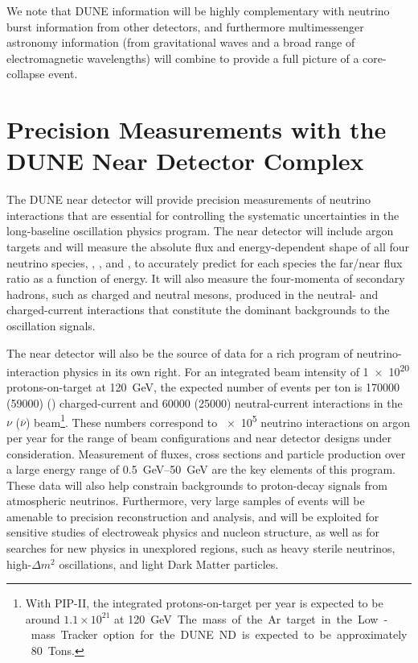 We note that DUNE information will be highly complementary with neutrino burst information from other detectors, and furthermore multimessenger astronomy information (from gravitational waves and a broad range of electromagnetic wavelengths) will combine to provide a full picture of a core-collapse event.



\section{Precision Measurements with the DUNE Near Detector Complex}
\label{sec:exec-summ-nd-precision-physics}

The DUNE near detector
will provide precision measurements of
neutrino interactions that are essential
for controlling the systematic uncertainties in the long-baseline
oscillation physics program.  The near detector 
will include argon targets and will measure the absolute flux and energy-dependent
shape of all four neutrino species, \numu, \anumu, \nue and \anue,
to accurately predict for each species the
far/near flux ratio as a function of energy.  It will also measure the
four-momenta of secondary hadrons, such as charged and neutral mesons,
produced in the neutral- and charged-current interactions that
constitute the dominant backgrounds to the oscillation signals.

The near detector will also be the source of data for a rich program
of neutrino-interaction physics in its own right. For an integrated
beam intensity of \num{1e20} 
protons-on-target at \SI{120}{GeV}, the expected number of events per
ton is \num{170000} (\num{59000}) 
\numu (\anumu) charged-current and \num{60000} (\num{25000}) neutral-current interactions in the $\nu$ ($\overline\nu$) beam\footnote{With PIP-II, the integrated protons-on-target per year is
  expected to be around $1.1\times 10^{21}$ at \SI{120}\GeV. The mass
  of the Ar target in the Low-mass Tracker option for the DUNE ND is expected to be approximately
  80 Tons.}. 
  These numbers correspond to \num{e5} neutrino interactions
on argon per year for the range of beam configurations and near detector
designs under consideration.  Measurement of fluxes, cross sections
and particle production over a large energy range of
\SIrange{0.5}{50}{\GeV} are the key elements of this program.  These
data will also help constrain backgrounds to proton-decay signals
from atmospheric neutrinos.  Furthermore, very large samples of events
will be amenable to precision reconstruction and analysis, and will be
exploited for sensitive studies of electroweak physics and nucleon
structure, as well as for searches for new physics in unexplored
regions, such as heavy sterile neutrinos, high-$\Delta m^2$
oscillations, and light Dark Matter particles. %

